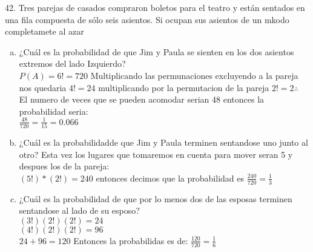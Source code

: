 \documentclass[12pt, letterpaper, spanish]{article}
\begin{document}
	42. Tres parejas de casados compraron boletos para el teatro y están sentados en una fila compuesta de sólo seis asientos. Si ocupan sus asientos de un mkodo completamete al azar
	\begin{enumerate}[a)]
	\item ¿Cuál es la probabilidad de que Jim y Paula se sienten en los dos asientos extremos del lado Izquierdo?\\
	$P(A)= 6! = 720$
	Multiplicando las permunaciones excluyendo a la pareja nos quedaria $4!=24$ multiplicando por la permutacion de la pareja $2!=2 \therefore$ \\
	El numero de veces que se pueden acomodar serian 48 entonces la probabilidad seria:\\
	$\displaystyle\frac{48}{720}= \displaystyle\frac{1}{15}=0.066$
	\item ¿Cuál es la probabilidadde que Jim y Paula terminen sentandose uno junto al otro?
	Esta vez los lugares que tomaremos en cuenta para mover seran 5 y despues los de la pareja:\\
	$(5!)*(2!)= 240$ entonces decimos que la probabilidad es $\frac{240}{720}=\frac{1}{3}$
	\item ¿Cuál es la probabilidad de que por lo menos dos de las esposas terminen sentandose al lado de su esposo?\\
	$(3!)(2!)(2!)=24$\\
	$(4!)(2!)(2!)=96$\\
	$24+96=120$ Entonces la probabilidas es de: $\frac{120}{720}=\frac{1}{6}$

\end{enumerate}
\end{document}
